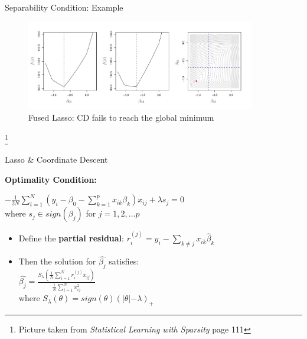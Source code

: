 \documentclass{beamer}
\begin{document}
\begin{frame}{Separability Condition: Example}
\begin{figure}[h]
\centering
\includegraphics[width=10cm]{img/Fused}
\caption{ Fused Lasso: CD fails to reach the global minimum}
\end{figure}
 \footnote{Picture taken from \textit{Statistical Learning with Sparsity}  page 111 }
\end{frame}

\begin{frame}{Lasso \& Coordinate Descent}

\textbf{Optimality Condition:}
\vspace*{4mm}

\(-\frac{1}{2N}\sum_{i=1}^{N}(y_{i}-\beta_0-\sum_{k=1}^{p}x_{ik}\beta_k)x_{ij}+ \lambda s_j=0\)
\vspace*{4mm}
 \\where \(s_j \in sign(\beta_j)\) for \(j=1,2,...p\)
 \vspace*{6mm}
 \begin{itemize}
     \item Define the \textbf{partial residual}: \(r_{i}^{(j)}=y_i-\sum_{k\neq j}x_{ik}\hat{\beta}_k\)
    \item Then the solution for \(\hat{\beta_j}\) satisfies:\\
\vspace*{4mm}
    \(\hat{\beta_j}=\frac{S_{\lambda}(\frac{1}{N}\sum_{i=1}^{N}r_i^{(j)}       x_{ij} )}{\frac{1}{N}\sum_{i=1}^{N}x_{ij}^2}\)\\
\vspace*{4mm}
    where \(S_{\lambda}(\theta) =sign(\theta)(\lvert\theta\lvert-\lambda)_{+}\)
\end{itemize}
    
\end{frame}
\end{document}
